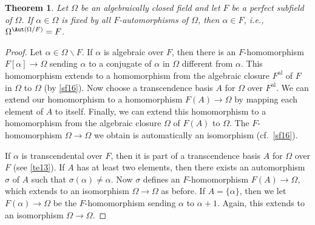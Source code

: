 \documentclass[a4paper,11pt,final,openany]{memoir}
\newtheorem{theorem}[X]{Theorem}
\newtheorem{remark}[X]{Remark}
\theoremstyle{nonumberplain}
\newtheorem{proof}{Proof.}
\begin{document}
\begin{theorem}
\label{te21} Let $\Omega$ be an algebraically closed field and let $F$ be a
perfect subfield of $\Omega$. If $\alpha\in\Omega$ is fixed by all
$F$-automorphisms of $\Omega$, then $\alpha\in F$, i.e., $\Omega
^{\Aut(\Omega/F)}=F$.
\end{theorem}

\begin{proof}
Let $\alpha\in\Omega\smallsetminus F$. If $\alpha$ is algebraic over $F$, then
there is an $F$-homomorphism $F[\alpha]\rightarrow\Omega$ sending $\alpha$ to
a conjugate of $\alpha$ in $\Omega$ different from $\alpha$. This homomorphism
extends to a homomorphism from the algebraic closure $F^{\mathrm{al}}$ of $F$
in $\Omega$ to $\Omega$ (by \ref{sf16}). Now choose a transcendence basis $A$
for $\Omega$ over $F^{\mathrm{al}}$. We can extend our homomorphism to a
homomorphism $F(A)\rightarrow\Omega$ by mapping each element of $A$ to itself.
Finally, we can extend this homomorphism to a homomorphism from the algebraic
closure $\Omega$ of $F(A)$ to $\Omega$. The $F$-homomorphism $\Omega
\rightarrow\Omega$ we obtain is automatically an isomorphism (cf.\ \ref{sf16}).

If $\alpha$ is transcendental over $F$, then it is part of a transcendence
basis $A$ for $\Omega$ over $F$ (see \ref{te13}). If $A$ has at least two
elements, then there exists an automorphism $\sigma$ of $A$ such that
$\sigma(\alpha)\neq\alpha$. Now $\sigma$ defines an $F$-homomorphism
$F(A)\rightarrow\Omega$, which extends to an isomorphism $\Omega
\rightarrow\Omega$ as before. If $A=\{\alpha\}$, then we let $F(\alpha
)\rightarrow\Omega$ be the $F$-homomorphism sending $\alpha$ to $\alpha+1$.
Again, this extends to an isomorphism $\Omega\rightarrow\Omega$.
\end{proof}

\end{document}
